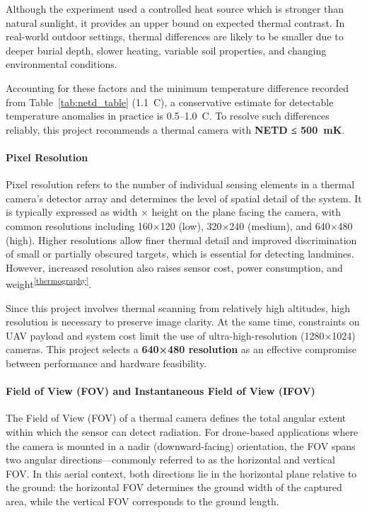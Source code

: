 Although the experiment used a controlled heat source which is stronger than natural sunlight, it provides an upper bound on expected thermal contrast. In real-world outdoor settings, thermal differences are likely to be smaller due to deeper burial depth, slower heating, variable soil properties, and changing environmental conditions.

Accounting for these factors and the minimum temperature difference recorded from Table~\ref{tab:netd_table} (1.1~\textdegree C), a conservative estimate for detectable temperature anomalies in practice is 0.5–1.0~\textdegree C. To resolve such differences reliably, this project recommends a thermal camera with \textbf{NETD ≤ 500~mK}.


\paragraph{Pixel Resolution}

Pixel resolution refers to the number of individual sensing elements in a thermal camera’s detector array and determines the level of spatial detail of the system. It is typically expressed as width × height on the plane facing the camera, with common resolutions including 160×120 (low), 320×240 (medium), and 640×480 (high). Higher resolutions allow finer thermal detail and improved discrimination of small or partially obscured targets, which is essential for detecting landmines. However, increased resolution also raises sensor cost, power consumption, and weight\textsuperscript{\ref{thermography}}.

Since this project involves thermal scanning from relatively high altitudes, high resolution is necessary to preserve image clarity. At the same time, constraints on UAV payload and system cost limit the use of ultra-high-resolution (1280×1024) cameras. This project selects a \textbf{640×480 resolution} as an effective compromise between performance and hardware feasibility.


\paragraph{Field of View (FOV) and Instantaneous Field of View (IFOV)}

The Field of View (FOV) of a thermal camera defines the total angular extent within which the sensor can detect radiation. For drone-based applications where the camera is mounted in a nadir (downward-facing) orientation, the FOV spans two angular directions—commonly referred to as the horizontal and vertical FOV. In this aerial context, both directions lie in the horizontal plane relative to the ground: the horizontal FOV determines the ground width of the captured area, while the vertical FOV corresponds to the ground length.

